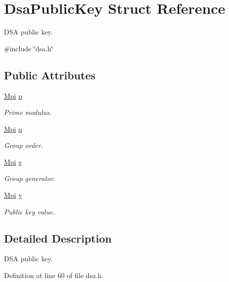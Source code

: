 \hypertarget{structDsaPublicKey}{}\section{Dsa\+Public\+Key Struct Reference}
\label{structDsaPublicKey}


D\+SA public key.  




{\ttfamily \#include \char`\"{}dsa.\+h\char`\"{}}

\subsection*{Public Attributes}
\begin{DoxyCompactItemize}
\item 
\hyperlink{structMpi}{Mpi} \hyperlink{structDsaPublicKey_a273f5bed06a946fd672c94283f49fc3e}{p}
\begin{DoxyCompactList}\small\item\em Prime modulus. \end{DoxyCompactList}\item 
\hyperlink{structMpi}{Mpi} \hyperlink{structDsaPublicKey_a7961fbb82f0c5c56b577d2247ffc9172}{q}
\begin{DoxyCompactList}\small\item\em Group order. \end{DoxyCompactList}\item 
\hyperlink{structMpi}{Mpi} \hyperlink{structDsaPublicKey_a910d43db2650efb256373b06521a23bf}{g}
\begin{DoxyCompactList}\small\item\em Group generator. \end{DoxyCompactList}\item 
\hyperlink{structMpi}{Mpi} \hyperlink{structDsaPublicKey_a47d0a3368a5a61e48cc36ed0414392a6}{y}
\begin{DoxyCompactList}\small\item\em Public key value. \end{DoxyCompactList}\end{DoxyCompactItemize}


\subsection{Detailed Description}
D\+SA public key. 

Definition at line 60 of file dsa.\+h.



